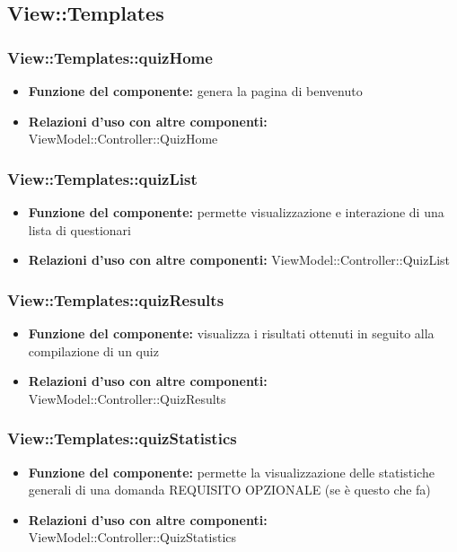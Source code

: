 \subsection{View::Templates}
\subsubsection{View::Templates::quizHome}
\begin{itemize}
\item\textbf{Funzione del componente:} genera la pagina di benvenuto\\
\item\textbf{Relazioni d'uso con altre componenti:} ViewModel::Controller::QuizHome\\
\end{itemize}
\subsubsection{View::Templates::quizList}
\begin{itemize}
\item\textbf{Funzione del componente:} permette visualizzazione e interazione di una lista di questionari\\
\item\textbf{Relazioni d'uso con altre componenti:} ViewModel::Controller::QuizList\\
\end{itemize}
\subsubsection{View::Templates::quizResults}
\begin{itemize}
\item\textbf{Funzione del componente:} visualizza i risultati ottenuti in seguito alla compilazione di un quiz\\
\item\textbf{Relazioni d'uso con altre componenti:} ViewModel::Controller::QuizResults\\
\end{itemize}
\subsubsection{View::Templates::quizStatistics}
\begin{itemize}
\item\textbf{Funzione del componente:} permette la visualizzazione delle statistiche generali di una domanda REQUISITO OPZIONALE (se è questo che fa)\\
\item\textbf{Relazioni d'uso con altre componenti:} ViewModel::Controller::QuizStatistics\\
\end{itemize}

